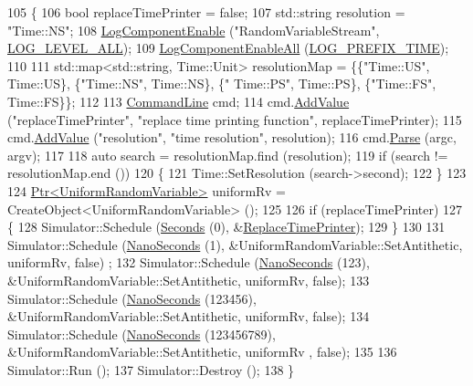 \begin{DoxyCode}
105 \{
106   \textcolor{keywordtype}{bool} replaceTimePrinter = \textcolor{keyword}{false};
107   std::string resolution = \textcolor{stringliteral}{"Time::NS"};
108   \hyperlink{namespacens3_adc4ef4f00bb2f5f4edae67fc3bc27f20}{LogComponentEnable} (\textcolor{stringliteral}{"RandomVariableStream"}, \hyperlink{namespacens3_aa6464a4d69551a9cc968e17a65f39bdba022b1237a4fd1b08d034471df3c58586}{LOG\_LEVEL\_ALL});
109   \hyperlink{namespacens3_aef610a7dcaaa6c20499283526b538582}{LogComponentEnableAll} (\hyperlink{namespacens3_aa6464a4d69551a9cc968e17a65f39bdba2b78ce26a040614a34c7d71db83024b9}{LOG\_PREFIX\_TIME});
110 
111   std::map<std::string, Time::Unit> resolutionMap = \{\{\textcolor{stringliteral}{"Time::US"}, Time::US\}, \{\textcolor{stringliteral}{"Time::NS"}, Time::NS\}, \{\textcolor{stringliteral}{"
      Time::PS"}, Time::PS\}, \{\textcolor{stringliteral}{"Time::FS"}, Time::FS\}\};
112 
113   \hyperlink{classns3_1_1CommandLine}{CommandLine} cmd;
114   cmd.\hyperlink{classns3_1_1CommandLine_addcfb546c7ad4c8bd0965654d55beb8e}{AddValue} (\textcolor{stringliteral}{"replaceTimePrinter"}, \textcolor{stringliteral}{"replace time printing function"}, replaceTimePrinter);
115   cmd.\hyperlink{classns3_1_1CommandLine_addcfb546c7ad4c8bd0965654d55beb8e}{AddValue} (\textcolor{stringliteral}{"resolution"}, \textcolor{stringliteral}{"time resolution"}, resolution);
116   cmd.\hyperlink{classns3_1_1CommandLine_a5c10b85b3207e5ecb48d907966923156}{Parse} (argc, argv);
117 
118   \textcolor{keyword}{auto} search = resolutionMap.find (resolution);
119   \textcolor{keywordflow}{if} (search != resolutionMap.end ())
120     \{
121       Time::SetResolution (search->second);
122     \}
123 
124   \hyperlink{classns3_1_1Ptr}{Ptr<UniformRandomVariable>} uniformRv = CreateObject<UniformRandomVariable> ();
125 
126   \textcolor{keywordflow}{if} (replaceTimePrinter)
127     \{
128       Simulator::Schedule (\hyperlink{group__timecivil_ga33c34b816f8ff6628e33d5c8e9713b9e}{Seconds} (0), &\hyperlink{sample-log-time-format_8cc_a27a66c094f2b03c9ec552bec80ba840b}{ReplaceTimePrinter});
129     \}
130 
131   Simulator::Schedule (\hyperlink{group__timecivil_ga281d64bcb4dad96267d83c7688ec433f}{NanoSeconds} (1), &UniformRandomVariable::SetAntithetic, uniformRv, \textcolor{keyword}{false})
      ;
132   Simulator::Schedule (\hyperlink{group__timecivil_ga281d64bcb4dad96267d83c7688ec433f}{NanoSeconds} (123), &UniformRandomVariable::SetAntithetic, uniformRv, \textcolor{keyword}{
      false});
133   Simulator::Schedule (\hyperlink{group__timecivil_ga281d64bcb4dad96267d83c7688ec433f}{NanoSeconds} (123456), &UniformRandomVariable::SetAntithetic, uniformRv, \textcolor{keyword}{
      false});
134   Simulator::Schedule (\hyperlink{group__timecivil_ga281d64bcb4dad96267d83c7688ec433f}{NanoSeconds} (123456789), &UniformRandomVariable::SetAntithetic, uniformRv
      , \textcolor{keyword}{false});
135 
136   Simulator::Run ();
137   Simulator::Destroy ();
138 \}
\end{DoxyCode}



